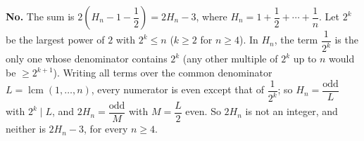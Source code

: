 \textbf{No.} The sum is $2\left(H_n-1-\dfrac{1}{2}\right)=2H_n-3$, where $H_n=1+\dfrac{1}{2}+\cdots+\dfrac{1}{n}$. Let $2^k$ be the largest power of $2$ with $2^k\le n$ ($k\ge2$ for $n\ge4$). In $H_n$, the term $\dfrac{1}{2^k}$ is the only one whose denominator contains $2^k$ (any other multiple of $2^k$ up to $n$ would be $\ge2^{k+1}$). Writing all terms over the common denominator $L=\operatorname{lcm}(1,\dots,n)$, every numerator is even except that of $\dfrac{1}{2^k}$; so $H_n=\dfrac{\text{odd}}{L}$ with $2^k\mid L$, and $2H_n=\dfrac{\text{odd}}{M}$ with $M=\dfrac {L}{2}$ even. So $2H_n$ is not an integer, and neither is $2H_n-3$, for every $n\ge4$.
